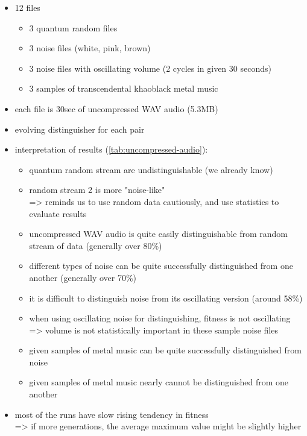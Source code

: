 \documentclass[12pt,oneside]{fithesis2}
\begin{document}
\begin{itemize}
\item 12 files
\begin{itemize}
\item 3 quantum random files
\item 3 noise files (white, pink, brown)
\item 3 noise files with oscillating volume (2 cycles in given 30 seconds)
\item 3 samples of transcendental khaoblack metal music
\end{itemize}
\item each file is 30sec of uncompressed WAV audio (5.3MB)
\item evolving distinguisher for each pair
\item interpretation of results (\autoref{tab:uncompressed-audio}):
\begin{itemize}
\item quantum random stream are undistinguishable (we already know)
\item random stream 2 is more "noise-like" \\ => reminds us to use random data cautiously, and use statistics to evaluate results
\item uncompressed WAV audio is quite easily distinguishable from random stream of data (generally over 80\%)
\item different types of noise can be quite successfully distinguished from one another (generally over 70\%)
\item it is difficult to distinguish noise from its oscillating version (around 58\%)
\item when using oscillating noise for distinguishing, fitness is not oscillating \\ => volume is not statistically important in these sample noise files
\item given samples of metal music can be quite successfully distinguished from noise
\item given samples of metal music nearly cannot be distinguished from one another
\end{itemize}
\item most of the runs have slow rising tendency in fitness \\ => if more generations, the average maximum value might be slightly higher
\end{itemize}
\end{document}
